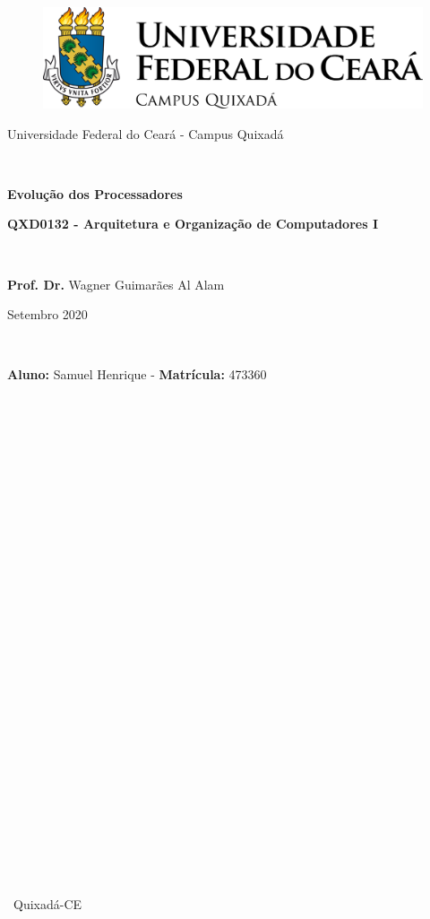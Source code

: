\documentclass[12pt]{article}
\begin{document}
	\begin{center}
		\begin{figure}[h!]
			\centering
			\includegraphics[scale=0.4]{logoufcquix.png}
			
		\end{figure}
		
		\large{Universidade Federal do Ceará - Campus Quixadá}
		\
		
		\
		
		\Large {\textbf{Evolução dos Processadores}} 
		
		\textbf{QXD0132 - Arquitetura e Organização de Computadores I}
		
		\
		
		\large{\textbf{Prof. Dr.} Wagner Guimarães Al Alam}
		
		Setembro 2020
		
		\
		
		\textbf{Aluno:} Samuel Henrique - \textbf{Matrícula:} 473360 \\
		
		\
		
		\
		
		\
	\end{center}
	\begin{center}
		
		\
		
		\
		
		\
		
		\
		
		\
		
		\
		
		\
		
		\
		
		\
		
		\
		
		\
		
		\
		
		\
		
		\
		
		\
		Quixadá-CE \ \ \  
	\end{center} \par
	\thispagestyle{empty}
	\newpage
	\onehalfspacing
\end{document}
